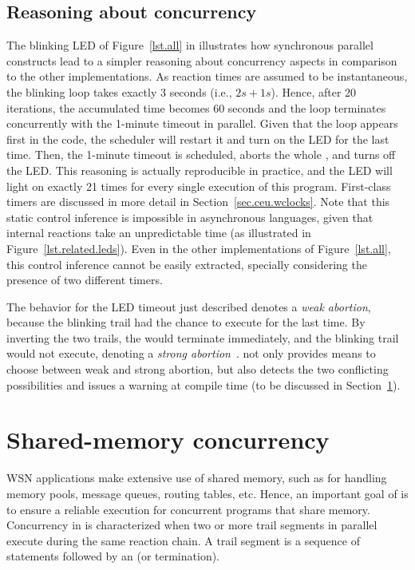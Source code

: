 \subsection{Reasoning about concurrency}

The blinking LED of Figure~\ref{lst.all} in \CEU illustrates how synchronous 
parallel constructs lead to a simpler reasoning about concurrency aspects in 
comparison to the other implementations.
As reaction times are assumed to be instantaneous, the blinking loop takes 
exactly 3 seconds (i.e., $2s+1s$).
Hence, after 20 iterations, the accumulated time becomes 60 seconds and the 
loop terminates concurrently with the 1-minute timeout in parallel.
Given that the loop appears first in the code, the scheduler will restart it 
and turn on the LED for the last time.
Then, the 1-minute timeout is scheduled, aborts the whole , and 
turns off the LED.
%
This reasoning is actually reproducible in practice, and the LED will light on 
exactly 21 times for every single execution of this program.
First-class timers are discussed in more detail in 
Section~\ref{sec.ceu.wclocks}.
%
Note that this static control inference is impossible in asynchronous 
languages, given that internal reactions take an unpredictable time (as 
illustrated in Figure~\ref{lst.related.leds}).
Even in the other implementations of Figure~\ref{lst.all}, this control 
inference cannot be easily extracted, specially considering the presence of two 
different timers.

The behavior for the LED timeout just described denotes a \emph{weak abortion}, 
because the blinking trail had the chance to execute for the last time.
By inverting the two trails, the  would terminate immediately, and 
the blinking trail would not execute, denoting a \emph{strong 
abortion}~\cite{esterel.preemption}.
%
\CEU not only provides means to choose between weak and strong abortion, but 
also detects the two conflicting possibilities and issues a warning at compile 
time (to be discussed in Section~\ref{sec.ceu.shared}).


\section{Shared-memory concurrency}
\label{sec.ceu.shared}

WSN applications make extensive use of shared memory, such as for handling 
memory pools, message queues, routing tables, etc.
Hence, an important goal of \CEU is to ensure a reliable execution for 
concurrent programs that share memory.
%
Concurrency in \CEU is characterized when two or more trail segments in 
parallel execute during the same reaction chain.
A trail segment is a sequence of statements followed by an  (or 
termination).

